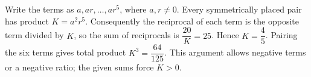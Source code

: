 Write the terms as $a,ar,\ldots,ar^5$, where $a,r\ne0$. Every symmetrically placed pair has product $K=a^2r^5$. Consequently the reciprocal of each term is the opposite term divided by $K$, so the sum of reciprocals is $\dfrac{20}{K}=25$. Hence $K=\dfrac{4}{5}$. Pairing the six terms gives total product $K^3=\boxed{\dfrac{64}{125}}$. This argument allows negative terms or a negative ratio; the given sums force $K>0$.
